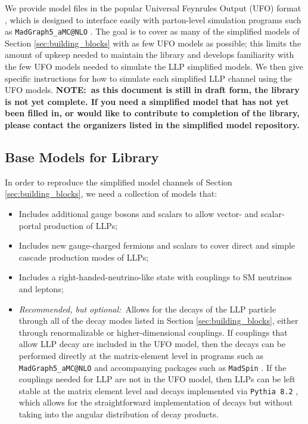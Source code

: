 We provide model files in the popular Universal Feynrules Output (UFO) format \cite{Degrande:2011ua}, which is designed to interface easily with parton-level simulation programs such as \texttt{MadGraph5\_aMC@}\texttt{NLO} \cite{Alwall:2014hca}. The goal is to cover as many of the simplified models of Section \ref{sec:building_blocks} with as few UFO models as possible; this limits the amount of upkeep needed to maintain the library and develops familiarity with the few UFO models needed to simulate the LLP simplified models. We then give specific instructions for how to simulate each simplified LLP channel using the UFO models. {\bf NOTE:~as this document is still in draft form, the library is not yet complete. If you need a simplified model that has not yet been filled in, or would like to contribute to completion of the library, please contact the organizers listed in the simplified model repository.}

\subsection{Base Models for Library}\label{sec:base}

In order to reproduce the simplified model channels of Section \ref{sec:building_blocks}, we need a collection of models that:
%
\begin{itemize}
\item Includes additional gauge bosons and scalars to allow vector- and scalar-portal production of LLPs;
\item Includes new gauge-charged fermions and scalars to cover direct and simple cascade production modes of LLPs;
\item Includes a right-handed-neutrino-like state with couplings to SM neutrinos and leptons;
\item \emph{Recommended, but optional:}~Allows for the decays of the LLP particle through all of the decay modes listed in Section \ref{sec:building_blocks}, either through renormalizable or higher-dimensional couplings. If couplings that allow LLP decay are included in the UFO model, then the decays can be performed directly at the matrix-element level in programs such as \texttt{MadGraph5\_aMC@}\texttt{NLO} \cite{Alwall:2014hca} and accompanying packages such as \texttt{MadSpin} \cite{Artoisenet:2012st}. If the couplings needed for LLP are not in the UFO model, then LLPs can be left stable at the matrix element level and decays implemented via \texttt{Pythia 8.2} \cite{Sjostrand:2007gs,Sjostrand:2014zea}, which allows for the straightforward implementation of decays but without taking into the angular distribution of decay products.
\end{itemize}

